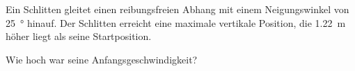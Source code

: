 \begin{aufgabe}

Ein Schlitten gleitet einen reibungsfreien Abhang mit einem Neigungswinkel von \SI{25}{\degree} hinauf.
Der Schlitten erreicht eine maximale vertikale Position, die \SI{1.22}{m} höher liegt als seine Startposition.

Wie hoch war seine Anfangsgeschwindigkeit?



\end{aufgabe}
